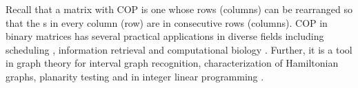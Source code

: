


Recall that a matrix with COP is one whose rows (columns) can be
rearranged so that the {\un}s in every column (row) are in consecutive
rows (columns). %
COP in binary matrices has several practical applications
in diverse fields including scheduling \cite{hl06}, information
retrieval \cite{k77} and computational biology \cite{abh98}.  Further,
it is a tool in graph theory \cite{mcg04} for interval graph
recognition, characterization of Hamiltonian graphs, planarity testing
\cite{bl76} and in integer linear programming \cite{ht02,hl06}.


